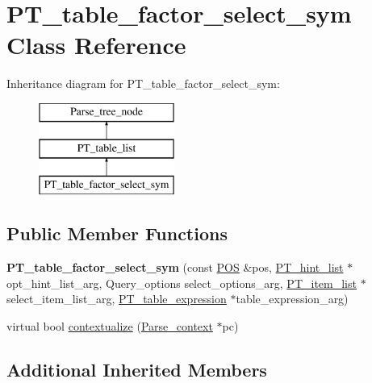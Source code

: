 \hypertarget{classPT__table__factor__select__sym}{}\section{P\+T\+\_\+table\+\_\+factor\+\_\+select\+\_\+sym Class Reference}
\label{classPT__table__factor__select__sym}
Inheritance diagram for P\+T\+\_\+table\+\_\+factor\+\_\+select\+\_\+sym\+:\begin{figure}[H]
\begin{center}
\leavevmode
\includegraphics[height=3.000000cm]{classPT__table__factor__select__sym}
\end{center}
\end{figure}
\subsection*{Public Member Functions}
\begin{DoxyCompactItemize}
\item 
\mbox{\label{classPT__table__factor__select__sym_ad98d5a8dad7530048d2fe88b7becd7c3}} 
{\bfseries P\+T\+\_\+table\+\_\+factor\+\_\+select\+\_\+sym} (const \mbox{\hyperlink{structYYLTYPE}{P\+OS}} \&pos, \mbox{\hyperlink{classPT__hint__list}{P\+T\+\_\+hint\+\_\+list}} $\ast$opt\+\_\+hint\+\_\+list\+\_\+arg, Query\+\_\+options select\+\_\+options\+\_\+arg, \mbox{\hyperlink{classPT__item__list}{P\+T\+\_\+item\+\_\+list}} $\ast$select\+\_\+item\+\_\+list\+\_\+arg, \mbox{\hyperlink{classPT__table__expression}{P\+T\+\_\+table\+\_\+expression}} $\ast$table\+\_\+expression\+\_\+arg)
\item 
virtual bool \mbox{\hyperlink{classPT__table__factor__select__sym_ab5e84e7a041385c3530b28b529b6b915}{contextualize}} (\mbox{\hyperlink{structParse__context}{Parse\+\_\+context}} $\ast$pc)
\end{DoxyCompactItemize}
\subsection*{Additional Inherited Members}


